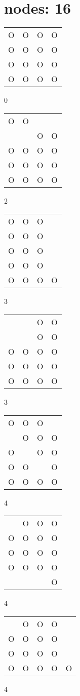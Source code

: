 \section{nodes: 16}
\begin{tabular}{|m{0.2cm}m{0.2cm}m{0.2cm}m{0.2cm}|}\hline
O&O&O&O\\
O&O&O&O\\
O&O&O&O\\
O&O&O&O\\
\hline\end{tabular}0
\begin{tabular}{|m{0.2cm}m{0.2cm}m{0.2cm}m{0.2cm}|}\hline
O&O& & \\
 & &O&O\\
O&O&O&O\\
O&O&O&O\\
O&O&O&O\\
\hline\end{tabular}2
\begin{tabular}{|m{0.2cm}m{0.2cm}m{0.2cm}m{0.2cm}|}\hline
O&O&O& \\
O&O&O& \\
O&O&O& \\
O&O&O& \\
O&O&O&O\\
\hline\end{tabular}3
\begin{tabular}{|m{0.2cm}m{0.2cm}m{0.2cm}m{0.2cm}|}\hline
 & &O&O\\
 & &O&O\\
O&O&O&O\\
O&O&O&O\\
O&O&O&O\\
\hline\end{tabular}3
\begin{tabular}{|m{0.2cm}m{0.2cm}m{0.2cm}m{0.2cm}|}\hline
O&O&O& \\
 &O&O&O\\
O& &O&O\\
O&O& &O\\
O&O&O&O\\
\hline\end{tabular}4
\begin{tabular}{|m{0.2cm}m{0.2cm}m{0.2cm}m{0.2cm}|}\hline
 &O&O&O\\
O&O&O&O\\
O&O&O&O\\
O&O&O&O\\
 & & &O\\
\hline\end{tabular}4
\begin{tabular}{|m{0.2cm}m{0.2cm}m{0.2cm}m{0.2cm}m{0.2cm}|}\hline
 &O&O&O& \\
O&O&O&O& \\
O&O&O&O& \\
O&O&O&O&O\\
\hline\end{tabular}4
